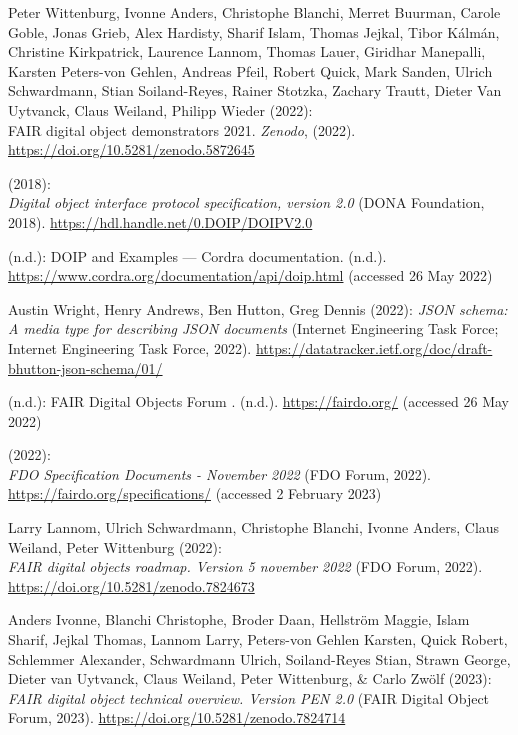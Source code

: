 \begin{thebibliography}{9}
Peter Wittenburg, Ivonne Anders, Christophe Blanchi, Merret Buurman,
Carole Goble, Jonas Grieb, Alex Hardisty, Sharif Islam, Thomas Jejkal,
Tibor Kálmán, Christine Kirkpatrick, Laurence Lannom, Thomas Lauer,
Giridhar Manepalli, Karsten Peters-von Gehlen, Andreas Pfeil, Robert
Quick, Mark Sanden, Ulrich Schwardmann, Stian Soiland-Reyes, Rainer
Stotzka, Zachary Trautt, Dieter Van Uytvanck, Claus Weiland, Philipp
Wieder (2022): \\
{FAIR} digital object demonstrators 2021. \emph{Zenodo},
(2022).
\url{https://doi.org/10.5281/zenodo.5872645}

(2018): \\
\emph{Digital object interface protocol specification, version
2.0} ({DONA Foundation}, 2018).
\url{https://hdl.handle.net/0.DOIP/DOIPV2.0}

(n.d.): {DOIP} and {Examples} --- {Cordra} documentation. (n.d.).
\url{https://www.cordra.org/documentation/api/doip.html} (accessed 26
May 2022)

Austin Wright, Henry Andrews, Ben Hutton, Greg Dennis (2022):
\emph{JSON schema: A media type for describing JSON documents} (Internet
Engineering Task Force; Internet Engineering Task Force, 2022).
\url{https://datatracker.ietf.org/doc/draft-bhutton-json-schema/01/}

(n.d.): {FAIR Digital Objects Forum} \textbar. (n.d.).
\url{https://fairdo.org/} (accessed 26 May 2022)

(2022): \\
\emph{{FDO Specification Documents - November 2022}} ({FDO
Forum}, 2022). \url{https://fairdo.org/specifications/} (accessed 2
February 2023)

Larry Lannom, Ulrich Schwardmann, Christophe Blanchi, Ivonne Anders,
Claus Weiland, Peter Wittenburg (2022): \\
\emph{FAIR digital objects
roadmap. Version 5 november 2022} ({FDO Forum}, 2022).
\url{https://doi.org/10.5281/zenodo.7824673}

Anders Ivonne, Blanchi Christophe, Broder Daan, Hellström Maggie, Islam
Sharif, Jejkal Thomas, Lannom Larry, Peters-von Gehlen Karsten, Quick
Robert, Schlemmer Alexander, Schwardmann Ulrich, Soiland-Reyes Stian,
Strawn George, Dieter van Uytvanck, Claus Weiland, Peter Wittenburg, \&
Carlo Zwölf (2023): \\
\emph{{FAIR} digital object technical overview.
Version PEN 2.0} ({FAIR Digital Object Forum}, 2023).
\url{https://doi.org/10.5281/zenodo.7824714}


\end{thebibliography}

